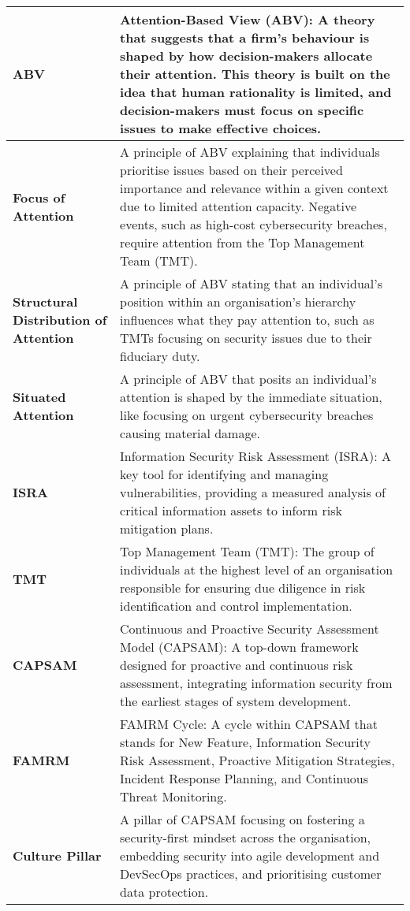 \begin{longtable}{|m{4cm}|m{10cm}|}
    \textbf{ABV} & Attention-Based View (ABV): A theory that suggests that a firm's behaviour is shaped by how decision-makers allocate their attention. This theory is built on the idea that human rationality is limited, and decision-makers must focus on specific issues to make effective choices. \\ \hline
    \textbf{Focus of Attention} & A principle of ABV explaining that individuals prioritise issues based on their perceived importance and relevance within a given context due to limited attention capacity. Negative events, such as high-cost cybersecurity breaches, require attention from the Top Management Team (TMT). \\ \hline
    \textbf{Structural Distribution of Attention} & A principle of ABV stating that an individual's position within an organisation's hierarchy influences what they pay attention to, such as TMTs focusing on security issues due to their fiduciary duty. \\ \hline
    \textbf{Situated Attention} & A principle of ABV that posits an individual's attention is shaped by the immediate situation, like focusing on urgent cybersecurity breaches causing material damage. \\ \hline
    \textbf{ISRA} & Information Security Risk Assessment (ISRA): A key tool for identifying and managing vulnerabilities, providing a measured analysis of critical information assets to inform risk mitigation plans. \\ \hline
    \textbf{TMT} & Top Management Team (TMT): The group of individuals at the highest level of an organisation responsible for ensuring due diligence in risk identification and control implementation. \\ \hline
    \textbf{CAPSAM} & Continuous and Proactive Security Assessment Model (CAPSAM): A top-down framework designed for proactive and continuous risk assessment, integrating information security from the earliest stages of system development. \\ \hline
    \textbf{FAMRM} & FAMRM Cycle: A cycle within CAPSAM that stands for New Feature, Information Security Risk Assessment, Proactive Mitigation Strategies, Incident Response Planning, and Continuous Threat Monitoring. \\ \hline
    \textbf{Culture Pillar} & A pillar of CAPSAM focusing on fostering a security-first mindset across the organisation, embedding security into agile development and DevSecOps practices, and prioritising customer data protection. \\ \hline

\end{longtable}
